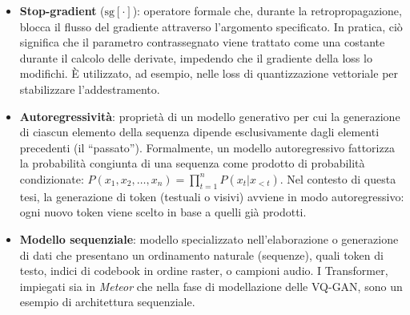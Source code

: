 \begin{itemize}
	\item \textbf{Stop-gradient} ($\mathrm{sg}[\cdot]$): operatore formale che, durante la retropropagazione, blocca il flusso del gradiente attraverso l'argomento specificato. In pratica, ciò significa che il parametro contrassegnato viene trattato come una costante durante il calcolo delle derivate, impedendo che il gradiente della loss lo modifichi. È utilizzato, ad esempio, nelle loss di quantizzazione vettoriale per stabilizzare l'addestramento.
	\item \textbf{Autoregressività}: proprietà di un modello generativo per cui la generazione di ciascun elemento della sequenza dipende esclusivamente dagli elementi precedenti (il ``passato''). Formalmente, un modello autoregressivo fattorizza la probabilità congiunta di una sequenza come prodotto di probabilità condizionate: $P(x_1, x_2, \dots, x_n) = \prod_{t=1}^n P(x_t | x_{<t})$. Nel contesto di questa tesi, la generazione di token (testuali o visivi) avviene in modo autoregressivo: ogni nuovo token viene scelto in base a quelli già prodotti.
	\item \textbf{Modello sequenziale}: modello specializzato nell'elaborazione o generazione di dati che presentano un ordinamento naturale (sequenze), quali token di testo, indici di codebook in ordine raster, o campioni audio. I Transformer, impiegati sia in \emph{Meteor} che nella fase di modellazione delle VQ-GAN, sono un esempio di architettura sequenziale.
\end{itemize}

